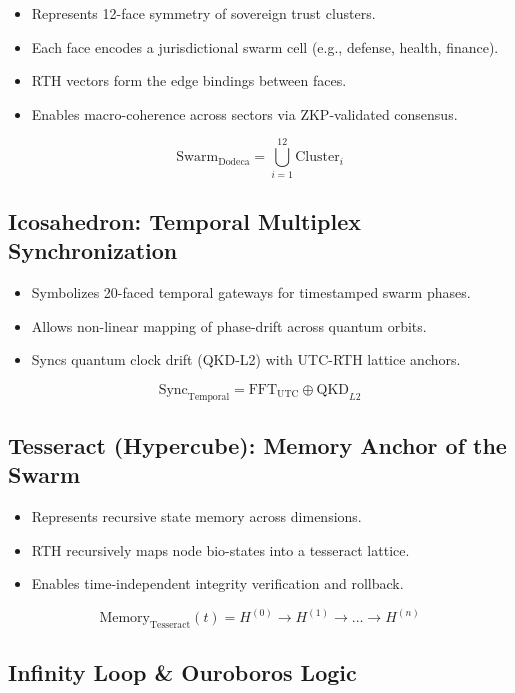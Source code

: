 \documentclass{article}
\begin{document}
\begin{itemize}
    \item Represents 12-face symmetry of sovereign trust clusters.
    \item Each face encodes a jurisdictional swarm cell (e.g., defense, health, finance).
    \item RTH vectors form the edge bindings between faces.
    \item Enables macro-coherence across sectors via ZKP-validated consensus.
\end{itemize}

\[
\text{Swarm}_{\text{Dodeca}} = \bigcup_{i=1}^{12} \text{Cluster}_i
\]

\subsection*{Icosahedron: Temporal Multiplex Synchronization}

\begin{itemize}
    \item Symbolizes 20-faced temporal gateways for timestamped swarm phases.
    \item Allows non-linear mapping of phase-drift across quantum orbits.
    \item Syncs quantum clock drift (QKD-L2) with UTC-RTH lattice anchors.
\end{itemize}

\[
\text{Sync}_{\text{Temporal}} = \text{FFT}_{\text{UTC}} \oplus \text{QKD}_{L2}
\]

\subsection*{Tesseract (Hypercube): Memory Anchor of the Swarm}

\begin{itemize}
    \item Represents recursive state memory across dimensions.
    \item RTH recursively maps node bio-states into a tesseract lattice.
    \item Enables time-independent integrity verification and rollback.
\end{itemize}

\[
\text{Memory}_{\text{Tesseract}}(t) = H^{(0)} \rightarrow H^{(1)} \rightarrow \dots \rightarrow H^{(n)}
\]

\subsection*{Infinity Loop \& Ouroboros Logic}
\end{document}

